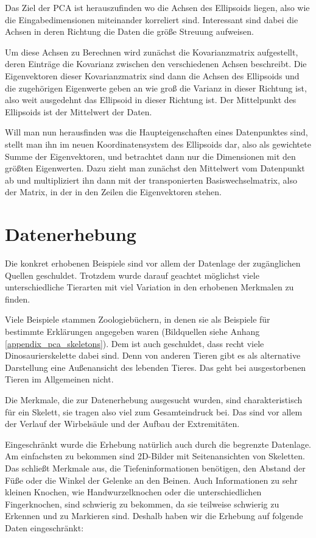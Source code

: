  Das Ziel der PCA ist herauszufinden wo die Achsen des Ellipsoids liegen, also wie die Eingabedimensionen miteinander korreliert sind. Interessant sind dabei die Achsen in deren Richtung die Daten die größe Streuung aufweisen.
 
 Um diese Achsen zu Berechnen wird zunächst die Kovarianzmatrix aufgestellt, deren Einträge die Kovarianz zwischen den verschiedenen Achsen beschreibt.
 Die Eigenvektoren dieser Kovarianzmatrix sind dann die Achsen des Ellipsoids und die zugehörigen Eigenwerte geben an wie groß die Varianz in dieser Richtung ist, also weit ausgedehnt das Ellipsoid in dieser Richtung ist. Der Mittelpunkt des Ellipsoids ist der Mittelwert der Daten.
 
 Will man nun herausfinden was die Haupteigenschaften eines Datenpunktes sind, stellt man ihn im neuen Koordinatensystem des Ellipsoids dar, also als gewichtete Summe der Eigenvektoren, und betrachtet dann nur die Dimensionen mit den größten Eigenwerten. Dazu zieht man zunächst den Mittelwert vom Datenpunkt ab und multipliziert ihn dann mit der transponierten Basiswechselmatrix, also der Matrix, in der in den Zeilen die Eigenvektoren stehen.


 \section{Datenerhebung}
 
 Die konkret erhobenen Beispiele sind vor allem der Datenlage \bzw der zugänglichen Quellen geschuldet. Trotzdem wurde darauf geachtet möglichst viele unterschiedliche Tierarten mit viel Variation in den erhobenen Merkmalen zu finden.
 
 Viele Beispiele stammen Zoologiebüchern, in denen sie als Beispiele für bestimmte Erklärungen angegeben waren (Bildquellen siehe Anhang \ref{appendix_pca_skeletons}). Dem ist auch geschuldet, dass recht viele Dinosaurierskelette dabei sind. Denn von anderen Tieren gibt es als alternative Darstellung eine Außenansicht des lebenden Tieres. Das geht bei ausgestorbenen Tieren im Allgemeinen nicht.
 
 Die Merkmale, die zur Datenerhebung ausgesucht wurden, sind charakteristisch für ein Skelett, sie tragen also viel zum Gesamteindruck bei. Das sind vor allem der Verlauf der Wirbelsäule und der Aufbau der Extremitäten.
  
 Eingeschränkt wurde die Erhebung natürlich auch durch die begrenzte Datenlage. Am einfachsten zu bekommen sind 2D-Bilder mit Seitenansichten von Skeletten. Das schließt Merkmale aus, die Tiefeninformationen benötigen, \zb den Abstand der Füße oder die Winkel der Gelenke an den Beinen. Auch Informationen zu sehr kleinen Knochen, wie Handwurzelknochen oder die unterschiedlichen Fingerknochen, sind schwierig zu bekommen, da sie teilweise schwierig zu Erkennen und zu Markieren sind. Deshalb haben wir die Erhebung auf folgende Daten eingeschränkt:
  
